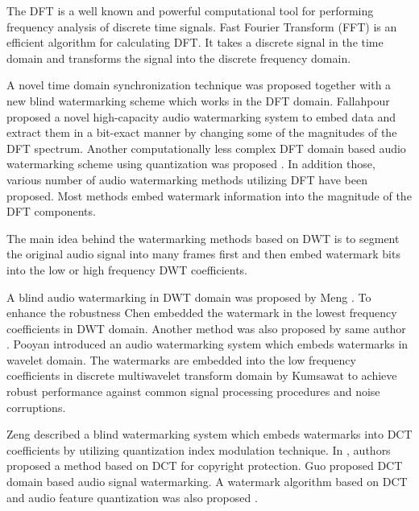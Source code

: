 \documentclass[12pt,a4paper]{report}
\begin{document}
The DFT is a well known and powerful computational tool for performing frequency analysis of discrete time signals. Fast Fourier Transform (FFT) is an efficient algorithm for calculating DFT. It takes a discrete signal in the time domain and transforms the signal into the discrete frequency domain.

\bigskip

A novel time domain synchronization technique \cite{david} was proposed together with a new blind watermarking scheme which works in the DFT domain. Fallahpour \cite{fallahpour} proposed a novel high-capacity audio watermarking system to embed data and extract them in a bit-exact manner by changing some of the magnitudes of the DFT spectrum. Another computationally less complex DFT domain based audio watermarking scheme using quantization was proposed \cite{wtan}. In addition those, various number of audio watermarking methods utilizing DFT have been proposed. Most methods embed watermark information into the magnitude of the DFT components.

\bigskip

The main idea behind the watermarking methods based on DWT is to segment the original audio signal into many frames first and then embed watermark bits into the low or high frequency DWT coefficients.

\bigskip

A blind audio watermarking in DWT domain was proposed by Meng \cite{meng}. To enhance the robustness Chen\cite{stchen} embedded the watermark in the lowest frequency coefficients in DWT domain. Another method was also proposed by same author \cite{stchen2}. Pooyan \cite{pooyan} introduced an audio watermarking system which embeds watermarks in wavelet domain. The watermarks are embedded into the low frequency coefficients in discrete multiwavelet transform domain by Kumsawat \cite{kumsawat2008digital} to achieve robust performance against common signal processing procedures and noise corruptions.

\bigskip

Zeng \cite{zeng} described a blind watermarking system which embeds watermarks into DCT coefficients by utilizing quantization index modulation technique. In \cite{pranab}, authors proposed a method based on DCT for copyright protection. Guo \cite{guo} proposed DCT domain based audio signal watermarking. A watermark algorithm based on DCT and audio feature quantization was also proposed \cite{quan2012audio}.

\bigskip
\end{document}
